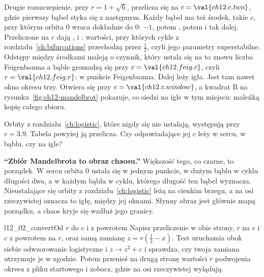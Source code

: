\noindent
Drugie rozszczepienie, przy $r = 1 + \sqrt{6}$, przelicza się na
$c = \val{ch12.c.two}$, gdzie pierwszy bąbel styka się z następnym. Każdy
bąbel ma też środek, takie $c$, przy którym orbita $0$ wraca dokładnie do
$0$: $-1$, potem , potem  i tak dalej.
Przeliczone na $r$ dają ,  i :
wartości, przy których cykle z rozdziału~\ref{ch:bifurcations} przechodzą
przez $\tfrac12$, czyli jego parametry superstabilne. Odstępy między
środkami maleją o czynnik, który ustala się na 
\dash{} to znowu liczba Feigenbauma \dash{} a bąble gromadzą się przy
$c = \val{ch12.feig.c}$, czyli $r = \val{ch12.feig.r}$: w punkcie
Feigenbauma. Dalej leży igła. Jest tam nawet okno okresu trzy. Otwiera się
przy $c = \val{ch12.c.window}$, a kwadrat B na
rysunku~\ref{fig:ch12-mandelbrot} pokazuje, co siedzi na igle w tym
miejscu: maleńką kopię całego zbioru.

\begin{think}
Orbity z rozdziału~\ref{ch:logistic}, które nigdy się nie ustalają,
występują przy $r = \num{3.9}$. Tabela powyżej ją przelicza. Czy odpowiadające jej
$c$ leży w sercu, w bąblu, czy na igle?
\end{think}

\begin{trapbox}
\textbf{\enquote{Zbiór Mandelbrota to obraz chaosu.}} Większość tego, co
czarne, to porządek. W sercu orbita $0$ ustala się w jednym punkcie, w dużym
bąblu w cyklu długości dwa, a w każdym bąblu w cyklu, którego długość ten
bąbel wyznacza. Nieustalające się orbity z rozdziału~\ref{ch:logistic} leżą
na cienkim brzegu, a na osi rzeczywistej oznacza to igłę, między jej
oknami. Słynny obraz jest głównie mapą porządku, a chaos kryje się wzdłuż jego
granicy.
\end{trapbox}

\begin{lab}{l12_02_convert}{Od $r$ do $c$ i z powrotem}
Napisz przeliczenie w obie strony, $r$ na $c$ i $c$ z powrotem na $r$, oraz
samą zamianę $z = r(\tfrac12 - x)$. Test uruchamia obok siebie
odwzorowanie logistyczne i $z \to z^{2} + c$ i sprawdza, czy twoja zamiana
utrzymuje je w zgodzie. Potem przenieś na drugą stronę wartości $r$
podwojenia okresu z pliku startowego i zobacz, gdzie na osi rzeczywistej
wylądują.
\end{lab}

